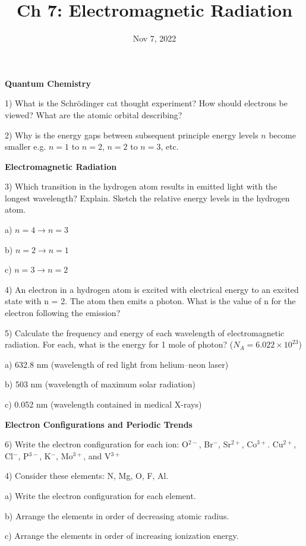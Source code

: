 \documentclass[12pt]{article}
\title{\textbf{Ch 7: Electromagnetic Radiation}}
\date{Nov 7, 2022}
\begin{document}
\maketitle 

\textbf{Quantum Chemistry}

1) What is the Schr\"{o}dinger cat thought experiment? How should
electrons be viewed? What are the atomic orbital describing?
\vspace{1in}

2) Why is the energy gaps between subsequent principle energy levels
$n$ become smaller e.g. $n=1$ to $n=2$, $n=2$ to $n=3$, etc.
\vspace{1in}

\textbf{Electromagnetic Radiation}

3) Which transition in the hydrogen atom results in emitted light with
the longest wavelength? Explain. Sketch the relative energy levels in the
hydrogen atom.

a) $n = 4 \rightarrow n = 3$

b) $n = 2 \rightarrow n = 1$

c) $n = 3 \rightarrow n = 2$

4) An electron in a hydrogen atom is excited with electrical energy to
an excited state with n = 2. The atom then emits a photon. What is
the value of n for the electron following the emission?
\vspace{1in}

5) Calculate the frequency and energy of each wavelength of electromagnetic
radiation. For each, what is the energy for 1 mole of photon? ($N_A = 6.022\times 10^{23}$) 

a) 632.8 nm (wavelength of red light from helium–neon laser)

b) 503 nm (wavelength of maximum solar radiation)

c) 0.052 nm (wavelength contained in medical X-rays)

\textbf{Electron Configurations and Periodic Trends}

6) Write the electron configuration for each ion:
O$^{2-}$, Br$^-$, Sr$^{2+}$, Co$^{3+}$. Cu$^{2+}$, Cl$^-$, P$^{3-}$,
K$^-$, Mo$^{3+}$, and V$^{3+}$

4) Consider these elements: N, Mg, O, F, Al.

a) Write the electron configuration for each element.

b) Arrange the elements in order of decreasing atomic radius.

c) Arrange the elements in order of increasing ionization energy.
\end{document}
